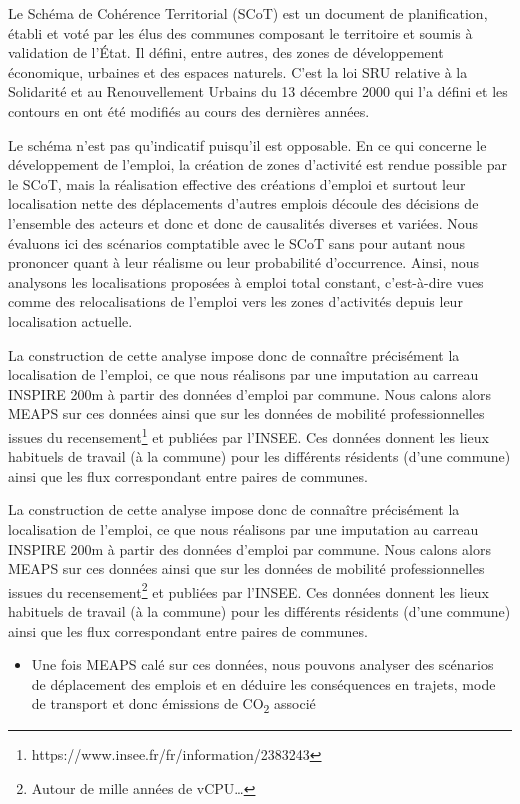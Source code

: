 \documentclass[
  10pt,
  a4paper,
  numbers=noendperiod,
  DIV=9]{scrreprt}
\providecommand{\tightlist}{%
  \setlength{\itemsep}{0pt}\setlength{\parskip}{0pt}}\usepackage{longtable,booktabs,array}
\begin{document}
Le Schéma de Cohérence Territorial (SCoT) est un document de
planification, établi et voté par les élus des communes composant le
territoire et soumis à validation de l'État. Il défini, entre autres,
des zones de développement économique, urbaines et des espaces naturels.
C'est la loi SRU relative à la Solidarité et au Renouvellement Urbains
du 13 décembre 2000 qui l'a défini et les contours en ont été modifiés
au cours des dernières années.

Le schéma n'est pas qu'indicatif puisqu'il est opposable. En ce qui
concerne le développement de l'emploi, la création de zones d'activité
est rendue possible par le SCoT, mais la réalisation effective des
créations d'emploi et surtout leur localisation nette des déplacements
d'autres emplois découle des décisions de l'ensemble des acteurs et donc
et donc de causalités diverses et variées. Nous évaluons ici des
scénarios comptatible avec le SCoT sans pour autant nous prononcer quant
à leur réalisme ou leur probabilité d'occurrence. Ainsi, nous analysons
les localisations proposées à emploi total constant, c'est-à-dire vues
comme des relocalisations de l'emploi vers les zones d'activités depuis
leur localisation actuelle.

La construction de cette analyse impose donc de connaître précisément la
localisation de l'emploi, ce que nous réalisons par une imputation au
carreau INSPIRE 200m à partir des données d'emploi par commune. Nous
calons alors MEAPS sur ces données ainsi que sur les données de mobilité
professionnelles issues du recensement\footnote{https://www.insee.fr/fr/information/2383243}
et publiées par l'INSEE. Ces données donnent les lieux habituels de
travail (à la commune) pour les différents résidents (d'une commune)
ainsi que les flux correspondant entre paires de communes.

La construction de cette analyse impose donc de connaître précisément la
localisation de l'emploi, ce que nous réalisons par une imputation au
carreau INSPIRE 200m à partir des données d'emploi par commune. Nous
calons alors MEAPS sur ces données ainsi que sur les données de mobilité
professionnelles issues du recensement\footnote{Autour de mille années
  de vCPU\ldots{}} et publiées par l'INSEE. Ces données donnent les
lieux habituels de travail (à la commune) pour les différents résidents
(d'une commune) ainsi que les flux correspondant entre paires de
communes.

\begin{itemize}
\tightlist
\item
  Une fois MEAPS calé sur ces données, nous pouvons analyser des
  scénarios de déplacement des emplois et en déduire les conséquences en
  trajets, mode de transport et donc émissions de CO\textsubscript{2}
  associé
\end{itemize}
\end{document}
